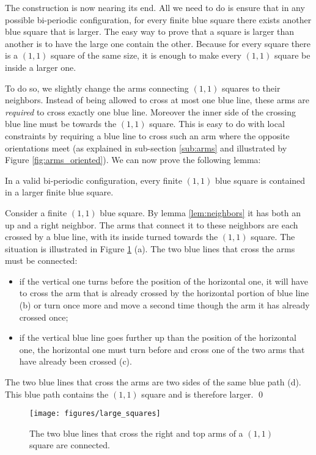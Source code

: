 \documentclass{jac}
\begin{document}
The construction is now nearing its end. All we need to do is ensure that in any possible bi-periodic configuration, for every finite blue square there exists another blue square that is larger. The easy way to prove that a square is larger than another is to have the large one contain the other. Because for every square there is a $(1, 1)$ square of the same size, it is enough to make every $(1, 1)$ square be inside a larger one.

To do so, we slightly change the arms connecting $(1, 1)$ squares to their neighbors. Instead of being allowed to cross at most one blue line, these arms are \emph{required} to cross exactly one blue line. Moreover the inner side of the crossing blue line must be towards the $(1,1)$ square. This is easy to do with local constraints by requiring a blue line to cross such an arm where the opposite orientations meet (as explained in sub-section \ref{sub:arms} and illustrated by Figure \ref{fig:arms_oriented}). We can now prove the following lemma:

\begin{lemma}\label{lem:large_squares}
    In a valid bi-periodic configuration, every finite $(1,1)$ blue square is contained in a larger finite blue square.
\end{lemma}
\proof
Consider a finite $(1, 1)$ blue square. By lemma \ref{lem:neighbors} it has both an up and a right neighbor. The arms that connect it to these neighbors are each crossed by a blue line, with its inside turned towards the $(1,1)$ square. The situation is illustrated in Figure \ref{fig:large_squares} (a). The two blue lines that cross the arms must be connected:
\begin{itemize}
    \item if the vertical one turns before the position of the horizontal one, it will have to cross the arm that is already crossed by the horizontal portion of blue line (b) or turn once more and move a second time though the arm it has already crossed once;
    \item if the vertical blue line goes further up than the position of the horizontal one, the horizontal one must turn before and cross one of the two arms that have already been crossed (c).
\end{itemize}
The two blue lines that cross the arms are two sides of the same blue path (d). This blue path contains the $(1,1)$ square and is therefore larger.
\qed
\begin{figure}[htbp]
    \centering
        \texttt{[image: figures/large\_squares]}
    \caption{The two blue lines that cross the right and top arms of a $(1,1)$ square are connected.}
    \label{fig:large_squares}
\end{figure}
\end{document}
